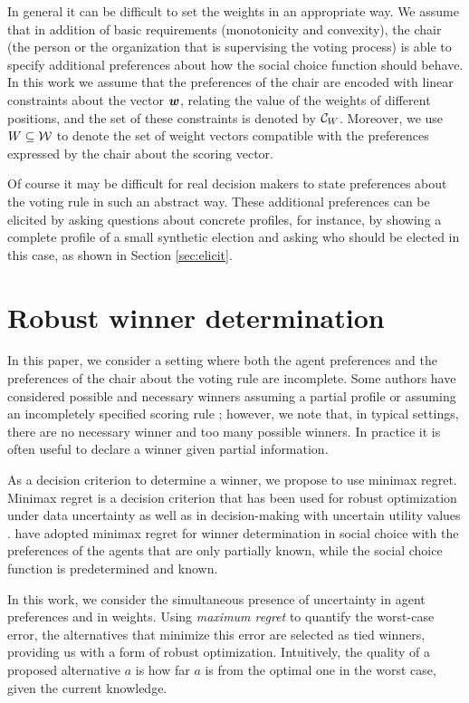 \documentclass[sigconf, anonymous]{aamas}
\begin{document}
In general it can be difficult to set the weights in an appropriate way.
We assume that in addition of basic requirements (monotonicity and convexity), the chair (the person or the organization that is supervising the voting process) is able to specify additional preferences about how the social choice function should behave.
In this work we assume that the preferences of the chair are encoded with linear constraints about the vector $\bm{w}$, relating the value of the weights of different positions, and the set of these constraints is denoted by $\mathcal{C}_W$. Moreover, we use $W \subseteq \mathcal{W}$ to denote the set of weight vectors compatible with the preferences expressed by the chair about the scoring vector.

Of course it may be difficult for real decision makers to state preferences about the voting rule in such an abstract way.
These additional preferences can be elicited by asking questions about concrete profiles, for instance, by showing a complete profile of a small synthetic election and asking who should be elected in this case, as shown in Section \ref{sec:elicit}.

\section[Minimax regret under partial profile and weight information]{
	Robust winner determination}
\label{sec:mmr}
In this paper, we consider a setting where both the agent preferences and the preferences of the chair about the voting rule are incomplete.
Some authors have considered possible and necessary winners assuming a partial profile  \citep{Kalech2011,Xia2008} or assuming an incompletely specified scoring rule \citep{Stein1994};
however, we note that, in typical settings, there are no necessary winner and too many possible winners.
In practice it is often useful to declare a winner given partial information.

As a decision criterion to determine a winner, we propose to use minimax regret. 
Minimax regret \citep{Savage1954} is a decision criterion that has been used for robust optimization under data uncertainty \citep{Kouvelis1997} as well as in decision-making with uncertain utility values \citep{Salo2001,Boutilier2006}.
\citet{Lu2011} have adopted minimax regret for winner determination in social choice with
the preferences of the agents that are only partially known, while the social choice function is predetermined and known.

In this work, we consider the simultaneous presence of uncertainty in agent preferences and in weights.
Using {\em maximum regret} to quantify the worst-case error, the alternatives that minimize this error are selected as tied winners, providing us with a form of robust optimization.
Intuitively, the quality of a proposed alternative $a$ is how far $a$ is from the optimal one in the worst case, given the current knowledge.
\end{document}
